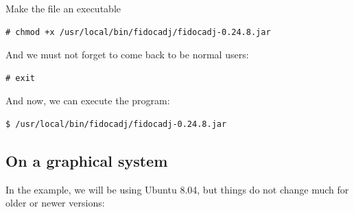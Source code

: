 \documentclass[10pt,a4paper,twoside]{scrreprt}
\begin{document}
Make the file an executable

\begin{lstlisting}
# chmod +x /usr/local/bin/fidocadj/fidocadj-0.24.8.jar
\end{lstlisting}

And we must not forget to come back to be normal users:

\begin{lstlisting}
# exit
\end{lstlisting}

And now, we can execute the program:

\begin{lstlisting}
$ /usr/local/bin/fidocadj/fidocadj-0.24.8.jar
\end{lstlisting}

\subsection{On a graphical system}
\label{inst_grafica}
In the example, we will be using Ubuntu 8.04, but things do not change much for older or newer versions:
\end{document}
